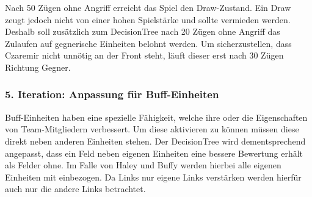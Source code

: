 Nach 50 Zügen ohne Angriff erreicht das Spiel den Draw-Zustand. Ein Draw zeugt jedoch nicht von einer hohen Spielstärke und sollte vermieden werden. Deshalb soll zusätzlich zum DecisionTree nach 20 Zügen ohne Angriff das Zulaufen auf gegnerische Einheiten belohnt werden. Um sicherzustellen, dass Czaremir nicht unnötig an der Front steht, läuft dieser erst nach 30 Zügen Richtung Gegner.

\subsubsection{5. Iteration: Anpassung für Buff-Einheiten}

Buff-Einheiten haben eine spezielle Fähigkeit, welche ihre oder die Eigenschaften von Team-Mitgliedern verbessert. Um diese aktivieren zu können müssen diese direkt neben anderen Einheiten stehen. Der DecisionTree wird dementsprechend angepasst, dass ein Feld neben eigenen Einheiten eine bessere Bewertung erhält als Felder ohne. Im Falle von Haley und Buffy werden hierbei alle eigenen Einheiten mit einbezogen. Da Links nur eigene Links verstärken werden hierfür auch nur die andere Links betrachtet.


